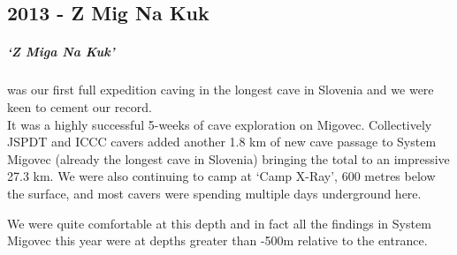 \begin{tcolorbox}
	\chapter{2013 - Z Mig Na Kuk}
	\paragraph{‘Z Miga Na Kuk’} was our first full expedition caving in the longest cave in Slovenia and we were keen to cement our record. 
	\\
It was a highly successful 5-weeks of cave exploration on Migovec. Collectively JSPDT and ICCC cavers added another 1.8 km of new cave passage to System Migovec (already the longest cave in Slovenia) bringing the total to an impressive 27.3 km. We were also continuing to camp at ‘Camp X-Ray’, 600 metres below the surface, and most cavers were spending multiple days underground here. 

We were quite comfortable at this depth and in fact all the findings in System Migovec this year were at depths greater than -500m relative to the entrance.
	\\
	\\
	\\
\end{tcolorbox}
\BgThispage
